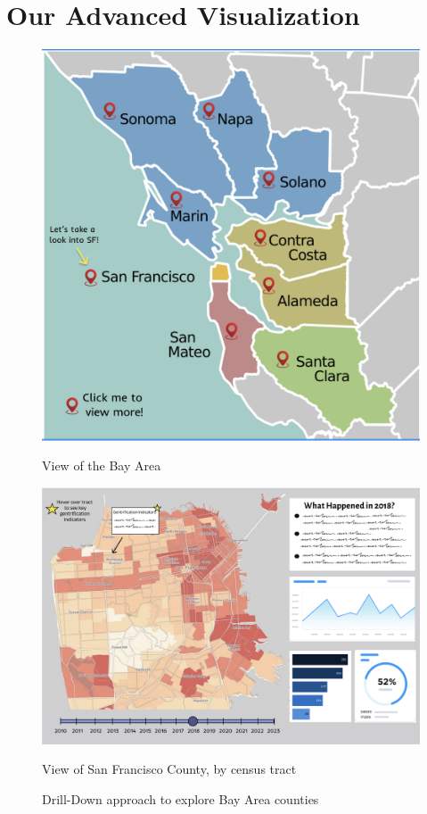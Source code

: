 \documentclass{article}
\begin{document}
\section{Our Advanced Visualization}

\begin{figure}[h!]
    \centering
    \begin{minipage}{0.48\textwidth}
        \centering
        \includegraphics[width=\linewidth]{figure_1.png}
        \caption{View of the Bay Area}
        \label{fig:first}
    \end{minipage}\hfill 
    \begin{minipage}{0.48\textwidth}
        \centering
        \includegraphics[width=\linewidth]{figure_2.png}
        \caption{View of San Francisco County, by census tract}
        \label{fig:second}
    \end{minipage}
    \caption{Drill-Down approach to explore Bay Area counties}
    \label{fig:combined}
\end{figure}
\end{document}
